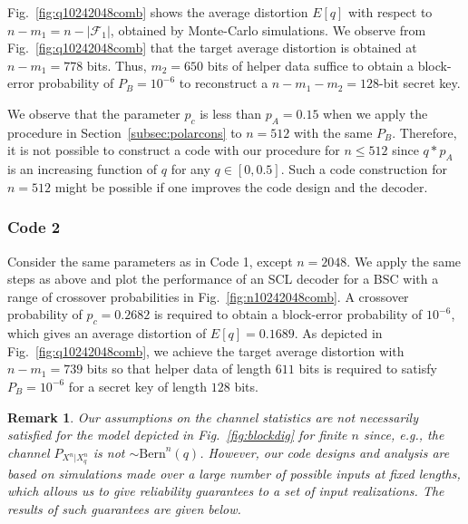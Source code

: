 \documentclass[journal,10pt,twoside]{IEEEtran}
\newtheorem{remark}{Remark}
\begin{document}
Fig.~\ref{fig:q10242048comb} shows the average distortion $E[q]$ with respect to $n-m_1=n-|\mathcal{F}_1|$, obtained by Monte-Carlo simulations. We observe from Fig.~\ref{fig:q10242048comb} that the target average distortion is obtained at $n-m_1=778$ bits. Thus, $m_2=650$ bits of helper data suffice to obtain a block-error probability of $P_B=10^{-6}$ to reconstruct a $n-m_1-m_2=128$-bit secret key. 

We observe that the parameter $p_c$ is less than $p_A=0.15$ when we apply the procedure in Section~\ref{subsec:polarcons} to $n=512$ with the same $P_B$. Therefore, it is not possible to construct a code with our procedure for $n\leq 512$ since $q*p_A$ is an increasing function of $q$ for any $q\in [0, 0.5]$. Such a code construction for $n=512$ might be possible if one improves the code design and the decoder.

\subsubsection*{Code 2} Consider the same parameters as in Code 1, except $n=2048$. We apply the same steps as above and plot the performance of an SCL decoder for a BSC with a range of crossover probabilities in Fig.~\ref{fig:n10242048comb}. A crossover probability of $p_c=0.2682$ is required to obtain a block-error probability of $10^{-6}$, which gives an average distortion of $E[q]=0.1689$. As depicted in Fig.~\ref{fig:q10242048comb}, we achieve the target average distortion with $n-m_1=739$ bits so that helper data of length $611$ bits is required to satisfy $P_B=10^{-6}$ for a secret key of length $128$ bits. 

\begin{remark}
	Our assumptions on the channel statistics are not necessarily satisfied for the model depicted in Fig.~\ref{fig:blockdig} for finite $n$ since, e.g., the channel $P_{X^n|X^n_q}$ is not $\sim\text{Bern}^n(q)$. However, our code designs and analysis are based on simulations made over a large number of possible inputs at fixed lengths, which allows us to give reliability guarantees to a set of input realizations. The results of such guarantees are given below. 
\end{remark}
\end{document}
